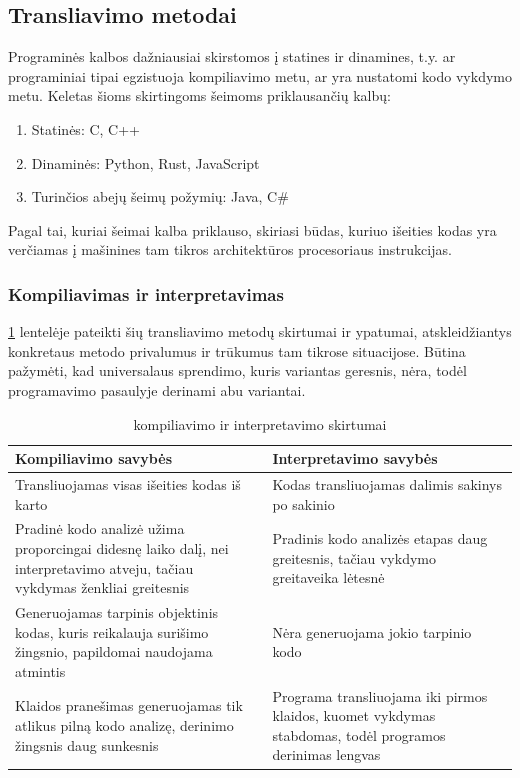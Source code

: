 \documentclass{VUMIFPSkursinis}
\begin{document}
\subsection{Transliavimo metodai}
Programinės kalbos dažniausiai skirstomos į statines ir dinamines, t.y. ar programiniai tipai egzistuoja kompiliavimo metu, ar yra nustatomi kodo vykdymo metu. Keletas šioms skirtingoms šeimoms priklausančių kalbų:
\begin{enumerate}
    \item Statinės: C, C++
    \item Dinaminės: Python, Rust, JavaScript
    \item Turinčios abejų šeimų požymių: Java, C\#
\end{enumerate} Pagal tai, kuriai šeimai kalba priklauso, skiriasi būdas, kuriuo išeities kodas yra verčiamas į mašinines tam tikros architektūros procesoriaus instrukcijas.

\subsubsection{Kompiliavimas ir interpretavimas}
\ref{tab:kompiliavimas_interpretavimas} lentelėje pateikti šių transliavimo metodų skirtumai ir ypatumai, atskleidžiantys konkretaus metodo privalumus ir trūkumus tam tikrose situacijose. Būtina pažymėti, kad universalaus sprendimo, kuris variantas geresnis, nėra, todėl programavimo pasaulyje derinami abu variantai.

\begin{table}[H]
  \centering
  \caption{kompiliavimo ir interpretavimo skirtumai \cite{PRO19}}
  {\begin{tabular}{|m{13em}|m{13em}|} \hline
     Kompiliavimo savybės & Interpretavimo savybės \\
    \hline
    Transliuojamas visas išeities kodas iš karto & Kodas transliuojamas dalimis 
 sakinys po sakinio \\
 \hline
 Pradinė kodo analizė 
     užima proporcingai didesnę laiko dalį, nei interpretavimo atveju, 
     tačiau vykdymas ženkliai greitesnis &
     Pradinis kodo analizės etapas daug greitesnis, 
     tačiau vykdymo greitaveika lėtesnė   \\
    \hline
     Generuojamas tarpinis objektinis kodas, kuris
 reikalauja surišimo žingsnio, papildomai naudojama atmintis & Nėra generuojama jokio tarpinio kodo \\
 \hline
 Klaidos pranešimas 
 generuojamas tik atlikus pilną kodo analizę, derinimo žingsnis daug sunkesnis &
 Programa transliuojama iki pirmos klaidos, kuomet 
 vykdymas stabdomas, todėl programos derinimas lengvas  \\
 \hline
  \end{tabular}}
  \label{tab:kompiliavimas_interpretavimas}
\end{table}
\end{document}
